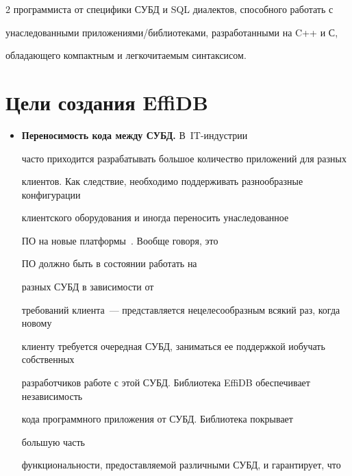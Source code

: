 \begin{multicols}{2}
программиста от специфики СУБД и SQL диалектов, способного работать с 

унаследованными приложениями/библиотеками, разработанными на C++ и С, 

обладающего компактным и легкочитаемым синтаксисом. 



\vspace*{-9pt}



\section{Цели создания EffiDB}



\vspace*{-2pt}



\noindent

\begin{itemize}

\item[$\bullet$] \textbf{Переносимость кода между СУБД.} В~IT-ин\-ду\-ст\-рии 

часто приходится разрабатывать большое количество приложений для разных 

клиентов. Как следствие, необходимо поддерживать разнообразные конфигурации 

клиентского оборудования и иногда переносить унаследованное 

ПО на новые платформы~\cite{1-y, 2-y}. Вообще говоря, это 

ПО должно быть в состоянии работать на\linebreak

 разных СУБД в зависимости от 

требований клиента~--- представляется нецелесообразным всякий раз, когда новому 

клиенту требуется очередная СУБД, заниматься ее поддержкой и\linebreak \mbox{обучать} собственных 

разработчиков работе с этой СУБД. Библиотека EffiDB обес\-пе\-чивает независимость 

кода программного приложения от СУБД. Библиотека покрывает\linebreak

 большую часть 

функциональности, пред\-остав\-ля\-емой различными СУБД, и гарантирует, что 


\end{itemize}
\end{multicols}
